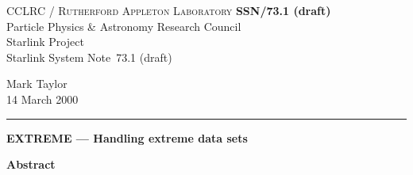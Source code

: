 \documentclass[twoside,11pt]{article}
\newcommand{\stardoccategory}  {Starlink System Note}
\newcommand{\stardocinitials}  {SSN}
\newcommand{\stardocnumber}    {73.1 (draft)}
\newcommand{\stardocauthors}   {Mark Taylor}
\newcommand{\stardocdate}      {14 March 2000}
\newcommand{\stardoctitle}     {EXTREME --- Handling extreme data sets}
\newcommand{\stardocname}{\stardocinitials /\stardocnumber}
\newenvironment{latexonly}{}{}
\renewcommand{\_}{\texttt{\symbol{95}}}
\begin{document}
\thispagestyle{empty}

\begin{latexonly}
   CCLRC / \textsc{Rutherford Appleton Laboratory} \hfill \textbf{\stardocname}\\
   {\large Particle Physics \& Astronomy Research Council}\\
   {\large Starlink Project\\}
   {\large \stardoccategory\ \stardocnumber}
   \begin{flushright}
   \stardocauthors\\
   \stardocdate
   \end{flushright}
   \vspace{-4mm}
   \rule{\textwidth}{0.5mm}
   \vspace{5mm}
   \begin{center}
   {\Large\textbf{\stardoctitle}}
   \end{center}
   \vspace{5mm}

   \vspace{10mm}
   \begin{center}
      {\Large\textbf{Abstract}}
   \end{center}
\end{latexonly}
\end{document}
